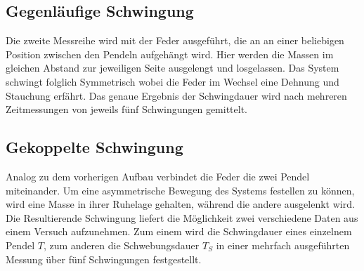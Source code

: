 
\subsection{Gegenläufige Schwingung}
Die zweite Messreihe wird mit der Feder ausgeführt, die an an einer beliebigen Position zwischen den Pendeln aufgehängt wird.
Hier werden die Massen im gleichen Abstand zur jeweiligen Seite ausgelengt und losgelassen. Das System schwingt
folglich Symmetrisch wobei die Feder im Wechsel eine Dehnung und Stauchung erfährt.
Das genaue Ergebnis der Schwingdauer wird nach mehreren Zeitmessungen von jeweils fünf Schwingungen gemittelt.


\subsection{Gekoppelte Schwingung}
Analog zu dem vorherigen Aufbau verbindet die Feder die zwei Pendel miteinander. Um eine asymmetrische Bewegung des Systems 
festellen zu können, wird eine Masse in ihrer Ruhelage gehalten, während die andere ausgelenkt wird.
Die Resultierende Schwingung liefert die Möglichkeit zwei verschiedene Daten aus einem Versuch aufzunehmen.
Zum einem wird die Schwingdauer eines einzelnem Pendel $T$, zum anderen die Schwebungsdauer $T_S$ in einer 
mehrfach ausgeführten Messung über fünf Schwingungen festgestellt.




